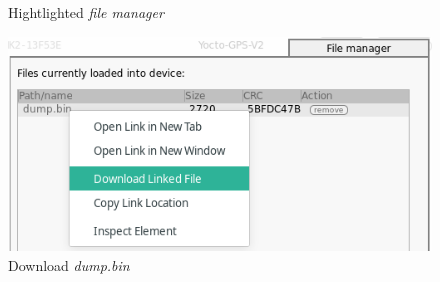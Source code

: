 \begin{figure}[H]
\begin{minipage}[b]{0.50\textwidth}
	  \caption{Hightlighted \emph{file manager}}
	  \label{fig:fileman}
  \end{minipage}
  \begin{minipage}[b]{0.50\textwidth}
	  \includegraphics[scale=.54]{images/yoctopuce_bug3.png}
	  \caption{Download \emph{dump.bin}}
	  \label{fig:downloadDump}
  \end{minipage}
\end{figure}
